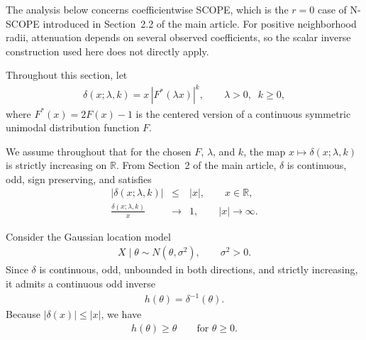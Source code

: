 \documentclass[11pt]{article}
\numberwithin{equation}{section}
\begin{document}
The analysis below concerns coefficientwise SCOPE, which is the
$r=0$ case of N-SCOPE introduced in Section~2.2 of the main article.
For positive neighborhood radii, attenuation depends on several
observed coefficients, so the scalar inverse construction used here
does not directly apply.

Throughout this section, let
\begin{eqnarray}
\delta(x;\lambda,k) = x\,|F^*(\lambda x)|^k,
\qquad \lambda>0,\;\; k\ge 0,
\label{eq:scope_bayes}
\end{eqnarray}
where $F^*(x)=2F(x)-1$ is the centered version of a continuous symmetric unimodal distribution function $F$.

We assume throughout that for the chosen $F$, $\lambda$, and $k$, the map
$x\mapsto \delta(x;\lambda,k)$ is strictly increasing on ${\mathbb R}$.
From Section~2 of the main article, $\delta$ is continuous, odd, sign preserving, and satisfies
\begin{eqnarray}
|\delta(x;\lambda,k)| &\leq& |x|, \qquad x\in{\mathbb R},\\
\frac{\delta(x;\lambda,k)}{x} &\longrightarrow& 1,
\qquad |x|\to\infty .
\end{eqnarray}


Consider the Gaussian location model
\begin{eqnarray}
X \mid \theta \sim N(\theta,\sigma^2),
\qquad \sigma^2>0.
\label{eq:gauss_loc}
\end{eqnarray}
Since $\delta$ is continuous, odd, unbounded in both directions, and strictly increasing, it admits a continuous odd inverse
\begin{eqnarray}
h(\theta) = \delta^{-1}(\theta).
\label{eq:h_inverse}
\end{eqnarray}
Because $|\delta(x)| \le |x|$, we have
\begin{eqnarray}
h(\theta) \ge \theta
\qquad \mbox{for } \theta \ge 0.
\label{eq:h_ge_theta}
\end{eqnarray}
\end{document}
